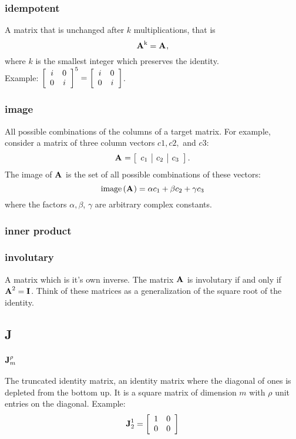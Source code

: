 \subsubsection*{idempotent}
A matrix that is unchanged after $k$ multiplications, that is
$$
\A{k} = \A{},
$$
where $k$ is the smallest integer which preserves the identity.\\

Example: $\mat{cc}{i&0\\0&i}^5=\mat{cc}{i&0\\0&i}$.

\subsubsection*{image}
All possible combinations of the columns of a target matrix. For example, consider a matrix of three column vectors $c1, c2,$ and $c3$:
\begin{equation}
  \A{} = \mat{c|c|c}{c_{1}&c_{2}&c_{3}}.
\end{equation}
The image of $\A{}$ is the set of all possible combinations of these vectors:
\begin{equation}
  \text{image}\paren{\A{}} = \alpha c_{1} + \beta c_{2} + \gamma c_{3}
\end{equation}
where the factors $\alpha, \beta$, $\gamma$ are arbitrary complex constants.

\subsubsection*{inner product}

\subsubsection*{involutary}
A matrix which is it's own inverse. The matrix $\A{}$ is involutary if and only if $\A{2} = \I{}$. Think of these matrices as a generalization of the square root of the identity.

\subsection*{J} 

\subsubsection*{$\J{m}{\rho}$}
The truncated identity matrix, an identity matrix where the diagonal of ones is depleted from the bottom up. It is a square matrix of dimension $m$ with $\rho $ unit entries on the diagonal.
Example:
$$
\J{2}{1} = \mat{ccc}{1 & 0 \\ 0 & 0}
$$


